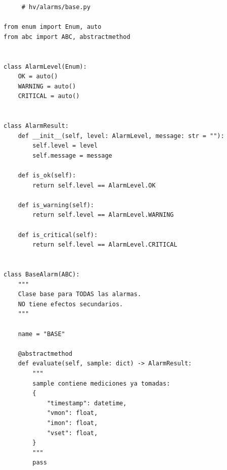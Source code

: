 \documentclass{article}
\begin{document}
\begin{lstlisting}
     # hv/alarms/base.py

from enum import Enum, auto
from abc import ABC, abstractmethod


class AlarmLevel(Enum):
    OK = auto()
    WARNING = auto()
    CRITICAL = auto()


class AlarmResult:
    def __init__(self, level: AlarmLevel, message: str = ""):
        self.level = level
        self.message = message

    def is_ok(self):
        return self.level == AlarmLevel.OK

    def is_warning(self):
        return self.level == AlarmLevel.WARNING

    def is_critical(self):
        return self.level == AlarmLevel.CRITICAL


class BaseAlarm(ABC):
    """
    Clase base para TODAS las alarmas.
    NO tiene efectos secundarios.
    """

    name = "BASE"

    @abstractmethod
    def evaluate(self, sample: dict) -> AlarmResult:
        """
        sample contiene mediciones ya tomadas:
        {
            "timestamp": datetime,
            "vmon": float,
            "imon": float,
            "vset": float,
        }
        """
        pass

\end{lstlisting}
\end{document}
